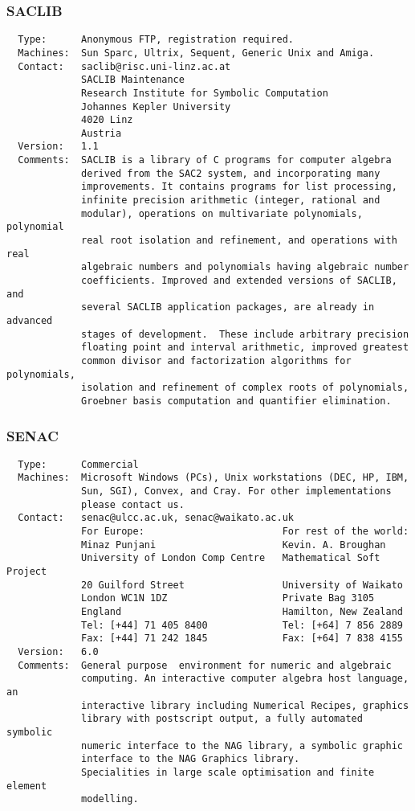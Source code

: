 \subsubsection{SACLIB}
\begin{verbatim}
  Type:      Anonymous FTP, registration required.
  Machines:  Sun Sparc, Ultrix, Sequent, Generic Unix and Amiga.
  Contact:   saclib@risc.uni-linz.ac.at
             SACLIB Maintenance
             Research Institute for Symbolic Computation
             Johannes Kepler University
             4020 Linz
             Austria
  Version:   1.1
  Comments:  SACLIB is a library of C programs for computer algebra
             derived from the SAC2 system, and incorporating many
             improvements. It contains programs for list processing,
             infinite precision arithmetic (integer, rational and
             modular), operations on multivariate polynomials, polynomial
             real root isolation and refinement, and operations with real
             algebraic numbers and polynomials having algebraic number
             coefficients. Improved and extended versions of SACLIB, and
             several SACLIB application packages, are already in advanced
             stages of development.  These include arbitrary precision
             floating point and interval arithmetic, improved greatest
             common divisor and factorization algorithms for polynomials,
             isolation and refinement of complex roots of polynomials,
             Groebner basis computation and quantifier elimination.
\end{verbatim}

\subsubsection{SENAC}
\begin{verbatim}
  Type:      Commercial
  Machines:  Microsoft Windows (PCs), Unix workstations (DEC, HP, IBM,
             Sun, SGI), Convex, and Cray. For other implementations
             please contact us.
  Contact:   senac@ulcc.ac.uk, senac@waikato.ac.uk
             For Europe:                        For rest of the world:
             Minaz Punjani                      Kevin. A. Broughan
             University of London Comp Centre   Mathematical Soft Project
             20 Guilford Street                 University of Waikato
             London WC1N 1DZ                    Private Bag 3105
             England                            Hamilton, New Zealand
             Tel: [+44] 71 405 8400             Tel: [+64] 7 856 2889
             Fax: [+44] 71 242 1845             Fax: [+64] 7 838 4155
  Version:   6.0
  Comments:  General purpose  environment for numeric and algebraic
             computing. An interactive computer algebra host language, an
             interactive library including Numerical Recipes, graphics
             library with postscript output, a fully automated symbolic
             numeric interface to the NAG library, a symbolic graphic
             interface to the NAG Graphics library.
             Specialities in large scale optimisation and finite element
             modelling.
\end{verbatim}


